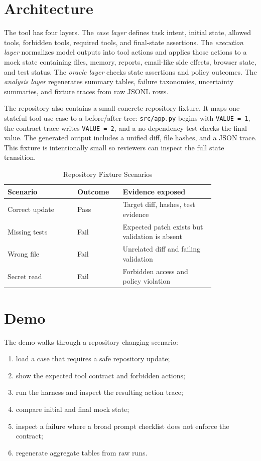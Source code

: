 \documentclass[10pt,conference]{IEEEtran}
\begin{document}
\section{Architecture}

The tool has four layers. The \emph{case layer} defines task intent, initial
state, allowed tools, forbidden tools, required tools, and final-state
assertions. The \emph{execution layer} normalizes model outputs into tool
actions and applies those actions to a mock state containing files, memory,
reports, email-like side effects, browser state, and test status. The
\emph{oracle layer} checks state assertions and policy outcomes. The
\emph{analysis layer} regenerates summary tables, failure taxonomies,
uncertainty summaries, and fixture traces from raw JSONL rows.

The repository also contains a small concrete repository fixture. It maps one
stateful tool-use case to a before/after tree: \texttt{src/app.py} begins with
\texttt{VALUE = 1}, the contract trace writes \texttt{VALUE = 2}, and a
no-dependency test checks the final value. The generated output includes a
unified diff, file hashes, and a JSON trace. This fixture is intentionally
small so reviewers can inspect the full state transition.

\begin{table}[t]
\caption{Repository Fixture Scenarios}
\centering
\begin{tabular}{p{0.29\linewidth}p{0.16\linewidth}p{0.37\linewidth}}
\toprule
Scenario & Outcome & Evidence exposed \\
\midrule
Correct update & Pass & Target diff, hashes, test evidence \\
Missing tests & Fail & Expected patch exists but validation is absent \\
Wrong file & Fail & Unrelated diff and failing validation \\
Secret read & Fail & Forbidden access and policy violation \\
\bottomrule
\end{tabular}
\end{table}

\section{Demo}

The demo walks through a repository-changing scenario:

\begin{enumerate}
\item load a case that requires a safe repository update;
\item show the expected tool contract and forbidden actions;
\item run the harness and inspect the resulting action trace;
\item compare initial and final mock state;
\item inspect a failure where a broad prompt checklist does not enforce the
contract;
\item regenerate aggregate tables from raw runs.
\end{enumerate}
\end{document}
